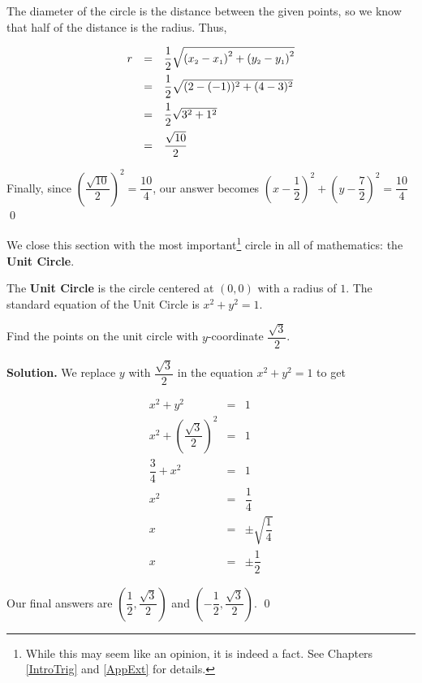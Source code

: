 \begin{ex}
The diameter of the circle is the distance between the given points, so we know that half of the distance is the radius.  Thus, 

\[ \begin{array}{rcl} r &  = & \dfrac{1}{2} \sqrt{\left(x_{\mbox{\tiny$2$}} - x_{\mbox{\tiny$1$}}\right)^2+\left(y_{\mbox{\tiny$2$}}-y_{\mbox{\tiny$1$}}\right)^2}  \\ [8pt]
 &  = & \dfrac{1}{2} \sqrt{(2-(-1))^2+(4-3)^2} \\ [8pt]
 & = & \dfrac{1}{2} \sqrt{3^2+1^2} \\ [8pt]
 & = &\dfrac{\sqrt{10}}{2} \end{array} \]

Finally, since $\left( \dfrac{\sqrt{10}}{2} \right)^2 = \dfrac{10}{4}$, our answer becomes $\left(x - \dfrac{1}{2} \right)^2 + \left(y - \dfrac{7}{2} \right)^2 =\dfrac{10}{4}$ \qed

\end{ex}

We close this section with the most important\footnote{While this may seem like an opinion, it is indeed a fact.  See Chapters \ref{IntroTrig} and \ref{AppExt} for details.}  circle in all of mathematics:  the \textbf{Unit Circle}.

\bigskip

\colorbox{ResultColor}{\bbm

\begin{defn}

The \textbf{Unit Circle}  \label{UnitCircle} is the circle centered at $(0,0)$ with a radius of $1$.  The standard equation of the Unit Circle is $x^2 + y^2 = 1.$

\end{defn}

\ebm}

\smallskip

\begin{ex}  Find the points on the unit circle with $y$-coordinate $\dfrac{\sqrt{3}}{2}$.

\medskip

{\bf Solution.}  We replace $y$ with $\dfrac{\sqrt{3}}{2}$ in the equation $x^2 + y^2 = 1$ to get 

 \[ \begin{array}{rcl} x^2 + y^2 & = & 1 \\
 x^2 + \left(\dfrac{\sqrt{3}}{2}\right)^2 & = & 1 \\ [13pt]
 \dfrac{3}{4} + x^2 & = & 1 \\
 x^2 & = & \dfrac{1}{4} \\
 x  & = & \pm \sqrt{\dfrac{1}{4}} \\ [7pt]
 x & = & \pm \dfrac{1}{2} \end{array} \]


Our final answers are  $\left(\dfrac{1}{2}, \dfrac{\sqrt{3}}{2} \right)$ and $\left(-\dfrac{1}{2}, \dfrac{\sqrt{3}}{2} \right)$.  \qed

\end{ex}

